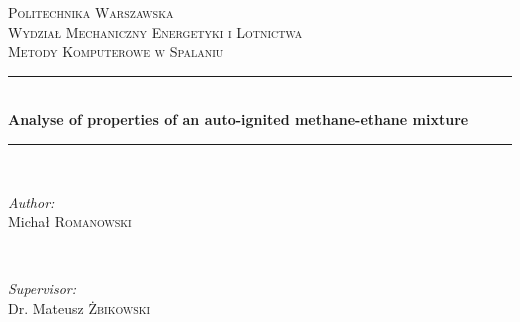 		\begin{titlepage}
			
			\newcommand{\HRule}{\rule{\linewidth}{0.5mm}} %
			
			\center %
			
			
			\textsc{\LARGE Politechnika Warszawska}\\[1cm] %
			\textsc{\Large Wydział Mechaniczny Energetyki i Lotnictwa}\\[0.5cm] %
			\textsc{\large Metody Komputerowe w Spalaniu}\\[0.5cm] %
			
			
			\HRule \\[0.4cm]
			{ \huge \bfseries Analyse of properties of an auto-ignited methane-ethane mixture }\\[0.4cm] %
			\HRule \\[1.5cm]
			
			
			\begin{minipage}{0.4\textwidth}
				\begin{flushleft} \large
					\emph{Author:}\\
					Michał \textsc{Romanowski} %
				\end{flushleft}
			\end{minipage}
			~
			\begin{minipage}{0.4\textwidth}
				\begin{flushright} \large
					\emph{Supervisor:} \\
					Dr. Mateusz \textsc{Żbikowski} %
				\end{flushright}
			\end{minipage}\\[1.5cm]
			

\end{titlepage}
